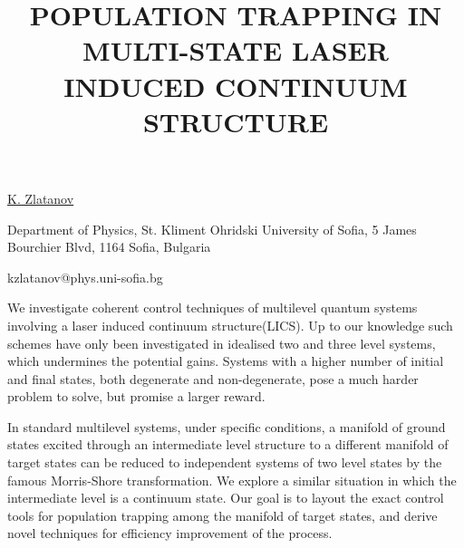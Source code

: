 \title{POPULATION TRAPPING IN MULTI-STATE LASER INDUCED CONTINUUM STRUCTURE}

\underline{K. Zlatanov} 

{\normalsize{\vspace{-4mm}
Department of Physics, St. Kliment Ohridski University of Sofia, 5 James Bourchier Blvd, 1164 Sofia, Bulgaria



\email kzlatanov@phys.uni-sofia.bg}}

We investigate coherent control techniques of multilevel quantum systems involving a laser induced continuum structure(LICS). Up to our knowledge such schemes have only been investigated in idealised two and three level systems, which undermines the potential gains. Systems with a higher number of initial and final states, both degenerate and non-degenerate, pose a much harder problem to solve, but promise a larger reward.

In standard multilevel systems, under specific conditions, a manifold of ground states excited through an intermediate level structure to a different manifold of target states can be reduced to independent systems of two level states by the famous Morris-Shore transformation. We explore a similar situation in which the intermediate level is a continuum  state. Our goal is to layout the exact control tools for population trapping among the manifold of target states, and derive novel techniques for efficiency  improvement of the process. 

\vspace{\baselineskip}
